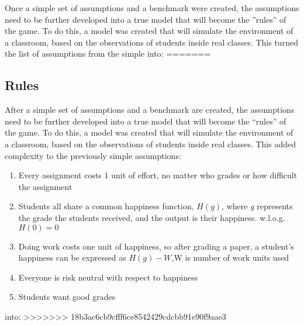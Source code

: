 \documentclass[12pt, Arial]{article}
\begin{document}
Once a simple set of assumptions and a benchmark were created, the assumptions need to be further developed into a true model that will become the ''rules'' of the game. To do this, a model was created that will simulate the environment of a classroom, based on the observations of students inside real classes. This turned the list of assumptions from the 
simple into:
=======
\subsection{Rules}
After a simple set of assumptions and a benchmark are created, the assumptions need to be further developed into a true model that will become the ``rules'' of the game. To do this, a model was created that will simulate the environment of a classroom, based on the observations of students inside real classes. This added complexity to the previously simple assumptions:
\begin{enumerate}
  \item Every assignment costs 1 unit of effort, no matter who grades or how difficult the assignment
  \item Students all share a common happiness function, $H(g)$, where \emph{g} represents the grade the students received, and the output is their happiness. w.l.o.g. $H(0)=0$
  \item Doing work costs one unit of happiness, so after grading a paper, a student's happiness can be expressed as $H(g)-W$,W is number of work units used
  \item Everyone is risk neutral with respect to happiness
  \item Students want good grades
\end{enumerate}
into:
>>>>>>> 18b3ac6cb9cfff6ce8542429cdcbb91e90f9aae3
\end{document}
